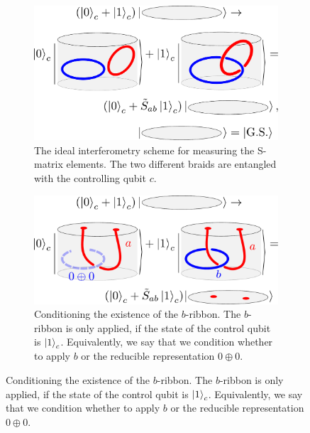 \documentclass[a4paper,twocolumn,11pt, accepted=2024-06-14]{quantumarticle}
\begin{document}
\begin{figure}
\centering

\begin{subfigure}{0.47\textwidth}
    \includegraphics[width = \linewidth]{Figures/intef_example.pdf}
    \caption{The ideal interferometry scheme for measuring the S-matrix elements. The two different braids are entangled with the controlling qubit $c$.}
    \label{fig:intef_example}
\end{subfigure}\hfill
\begin{subfigure}{0.47\textwidth}
    \includegraphics[width=\linewidth]{Figures/intefEx.pdf}
    \caption{Conditioning the existence of the $b$-ribbon. The $b$-ribbon is only applied, if the state of the control qubit is $\ket{1}_c$. Equivalently, we say that we condition whether to apply $b$ or the reducible representation $0\oplus 0$.}
    \label{fig:cond_ex}
\end{subfigure}


\vspace{15pt}


\end{figure}
\end{document}
